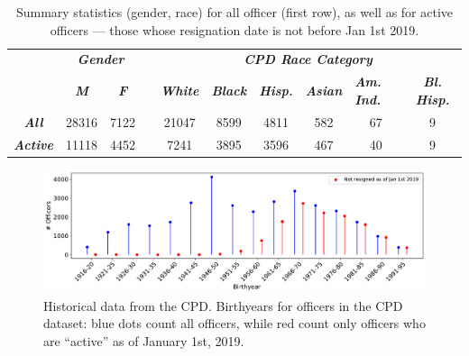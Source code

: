 \begin{table}[h]
\begin{tabular}{l|c|c|c|c|c|c|c|c|c|}
\cline{2-3} \cline{5-10}
                                               & \multicolumn{2}{c|}{\textit{\textbf{Gender}}} & \multicolumn{1}{l|}{} & \multicolumn{6}{c|}{\textit{\textbf{CPD Race Category}}}                                                                                                                                                   \\ \cline{2-3} \cline{5-10} 
                                               & \textit{\textbf{M}}   & \textit{\textbf{F}}   &                       & \textit{\textbf{White}} & \textit{\textbf{Black}} & \multicolumn{1}{l|}{\textit{\textbf{Hisp.}}} & \textit{\textbf{Asian}} & \multicolumn{1}{l|}{\textit{\textbf{Am. Ind.}}} & \textit{\textbf{Bl. Hisp.}} \\ \cline{1-3} \cline{5-10} 
\multicolumn{1}{|c|}{\textit{\textbf{All}}}    & 28316                 & 7122                  &                       & 21047                   & 8599                    & 4811                                         & 582                     & 67                                              & 9                           \\ \cline{1-3} \cline{5-10} 
\multicolumn{1}{|c|}{\textit{\textbf{Active}}} & 11118                 & 4452                  &                       & 7241                    & 3895                    & 3596                                         & 467                     & 40                                              & 9                           \\ \cline{1-3} \cline{5-10} 
\end{tabular}
\caption{Summary statistics (gender, race) for all officer (first row), as well as for active officers --- those whose resignation date is not before Jan 1st 2019.} \label{tab:stats}
\end{table}

\begin{figure}[h] 
	\includegraphics[width=\textwidth]{figs/history_by} 
	\caption{Historical data from the CPD. Birthyears for officers in the CPD dataset: blue dots count all officers, while red count only officers who are ``active'' as of January 1st, 2019.} \label{fig:history_by}
\end{figure}

